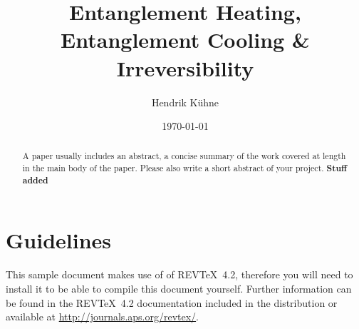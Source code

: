\documentclass[reprint,amsmath,amssymb,aps,prb]{revtex4-2}
\begin{document}
    \title{Entanglement Heating, Entanglement Cooling \& Irreversibility}
    \author{Hendrik Kühne}
    \date{\today}

    \begin{abstract}
        A paper usually includes an abstract, a concise summary of the work covered at length in the main body of the paper. Please also write a short abstract of your project.
        \textbf{Stuff added}
    \end{abstract}

    \maketitle

    \section{Guidelines}

    This sample document makes use of of REV\TeX~4.2, therefore you will need to install it to be able to compile this document yourself. Further information can be found in the REV\TeX~4.2
    documentation included in the distribution or available at \url{http://journals.aps.org/revtex/}. \cite{pennylanedocs:fidelity}

    

    \appendix
\end{document}
